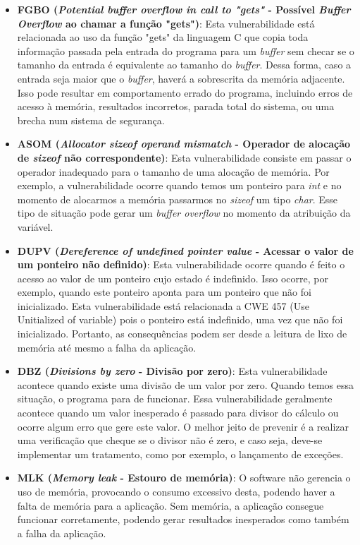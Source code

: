 \begin{itemize}
\item \textbf{FGBO (\emph{Potential buffer overflow in call to "gets" } - Possível \emph{Buffer Overflow} ao chamar a função "gets")}: Esta vulnerabilidade está relacionada ao uso da função "gets" da linguagem C que copia toda informação passada pela entrada do programa para um \emph{buffer} sem checar se o tamanho da entrada é equivalente ao tamanho do \emph{buffer}. Dessa forma, caso a entrada seja maior que o \emph{buffer}, haverá a sobrescrita da memória adjacente. Isso pode resultar em comportamento errado do programa, incluindo erros de acesso à memória, resultados incorretos, parada total do sistema, ou uma brecha num sistema de segurança.


\item \textbf{ASOM (\emph{Allocator sizeof operand mismatch } - Operador de alocação de \emph{sizeof} não correspondente)}:
%
Esta vulnerabilidade consiste em passar o operador inadequado para o tamanho de uma alocação de memória. Por exemplo, a vulnerabilidade ocorre quando temos um ponteiro para \emph{int} e no momento de alocarmos a memória passarmos no \emph{sizeof} um tipo \emph{char}. Esse tipo de situação pode gerar um \emph{buffer overflow} no momento da atribuição da variável.

\item \textbf{DUPV (\emph{Dereference of undefined pointer value } - Acessar o valor de um ponteiro não definido)}:
%
Esta vulnerabilidade ocorre quando é feito o acesso ao valor de um ponteiro cujo estado é indefinido. Isso ocorre, por exemplo, quando este ponteiro aponta para um ponteiro que não foi inicializado. Esta vulnerabilidade está relacionada a CWE 457 (Use Unitialized of variable) pois o ponteiro está indefinido, uma vez que não foi inicializado. Portanto, as consequências podem ser desde a leitura de lixo de memória até mesmo a falha da aplicação.

\item \textbf{DBZ (\emph{Divisions by zero } - Divisão por zero)}:
%
Esta vulnerabilidade acontece quando existe uma divisão de um valor por zero. Quando temos essa situação, o programa para de funcionar. Essa vulnerabilidade geralmente acontece quando um valor inesperado é passado para divisor do cálculo ou ocorre algum erro que gere este valor. O melhor jeito de prevenir é a realizar uma verificação que cheque se o divisor não é zero, e caso seja, deve-se implementar um tratamento, como por exemplo, o lançamento de exceções.

\item \textbf{MLK (\emph{Memory leak } - Estouro de memória)}:
%
O software não gerencia o uso de memória, provocando o consumo excessivo desta, podendo haver a falta de memória para a aplicação. Sem memória, a aplicação consegue funcionar corretamente, podendo gerar resultados inesperados como também a falha da aplicação.


\end{itemize}

